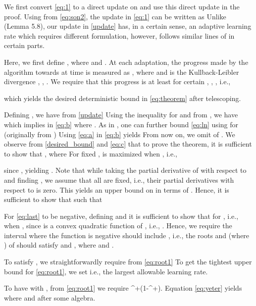 \documentclass[journal]{IEEEtran}
\newcommand{\be}{}
\begin{document}
We first convert \eqref{eq:1} to a direct update on  and
use this direct update in the proof. Using  from \eqref{eq:son2}, the update in \eqref{eq:1} can be written as
\small
\normalsize
Unlike \cite{KiWa02} (Lemma 5.8), our update in \eqref{update} has,
in a certain sense, an adaptive learning rate  which requires different formulation, however, follows
similar lines of \cite{KiWa02} in certain parts.

Here, we first define , where  and .  At each
adaptation, the progress made by the algorithm towards  at time
 is measured as , where  and  is the
Kullback-Leibler divergence \cite{cesab}, , . We require that this
progress is at least 
for certain , ,  \cite{cesab,KiWa02}, i.e.,

which yields the desired deterministic bound in \eqref{eq:theorem}
after telescoping.

Defining , we have from \eqref{update}
\normalsize
Using the inequality  for  and  from \cite{cesab}, we have
\normalsize
which implies in \eqref{eq:b}
\normalsize
where . As in \cite{KiWa02}, one can further bound
\eqref{eq:ln} using  for  (originally from \cite{cesab})
\normalsize
Using
\eqref{eq:a} in \eqref{eq:b} yields
\normalsize
From now on, we omit  of . We observe from \eqref{desired_bound} and \eqref{eq:c} that to prove the
theorem, it is sufficient to show that
, where
\normalsize
For fixed ,
 is maximized when
, i.e.,

since ,
yielding .
Note that while taking the partial derivative of  with
respect to  and finding , we assume
that all  are fixed, i.e., their partial
derivatives with respect to  is zero. This yields an
upper bound on  in terms of . Hence, it is
sufficient to show that  such that \cite{KiWa02}
\normalsize

For \eqref{eq:last} to be negative, defining  and
\normalsize
it is sufficient to show that  for , i.e.,  when
, since  is a convex quadratic
function of , i.e., . Hence,
we require the interval where the function  is negative
should include , i.e., the roots  and
 (where ) of  should satisfy  and , where
and .


To satisfy , we straightforwardly require from \eqref{eq:root1}
\normalsize
To get the tightest upper bound for \eqref{eq:root1}, we set
\normalsize
i.e., the largest allowable learning rate.

To have  with , from
\eqref{eq:root1} we require \be
{} \leq
\lambda^+(1-\lambda^+). \label{eq:yeter} \ee Equation \eqref{eq:yeter}
yields
\normalsize
where
\normalsize
and  after some algebra.
\end{document}
